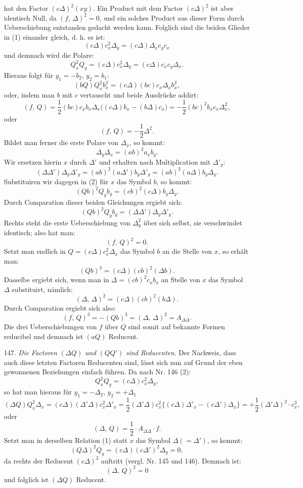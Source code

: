 \documentclass[11pt]{article}
\providecommand{\weberpage}[1]{}
\providecommand{\weq}[2]{\begin{equation}\tag{#1}#2\end{equation}}
\let\Delta\varDelta
\begin{document}
\weberpage{170}
hat den Factor $(c\Delta)^2(xy)$. Ein Product mit dem Factor $(c\Delta)^2$ ist aber identisch Null, da $(f,\,\Delta)^2 = 0$, und ein solches Product aus dieser Form durch Ueberschiebung entstanden gedacht werden kann. Folglich sind die beiden Glieder in (1) einander gleich, d. h. es ist:
\[
(c\Delta)c_x^2 \Delta_y = (c\Delta)\Delta_x c_y c_x
\]
und demnach wird die Polare:
\weq{2}{Q_x^2 Q_y = (c\Delta)c_x^2 \Delta_y = (c\Delta)c_x c_y \Delta_x.}
Hieraus folgt für $y_1 = -b_2$, $y_2 = b_1$:
\[
(bQ)Q_x^2 b_x^2 = (c\Delta)(bc)c_x \Delta_x b_x^2,
\]
oder, indem man $b$ mit $c$ vertauscht und beide Ausdrücke addirt:
\[
(f,\,Q) = \frac{1}{2}(bc)c_x b_x \Delta_x \big((c\Delta)b_x - (b\Delta)c_x\big)
= -\frac{1}{2}(bc)^2 b_x c_x \Delta_x^2,
\]
oder
\weq{I}{(f,\,Q) = -\frac{1}{2}\Delta^2.}
Bildet man ferner die erste Polare von $\Delta_x$, so kommt:
\weq{3}{\Delta_y \Delta_x = (ab)^2 a_x b_y.}
Wir ersetzen hierin $x$ durch $\Delta'$ und erhalten nach Multiplication mit $\Delta'_y$:
\[
(\Delta\Delta')\Delta_y \Delta'_y = (ab)^2(a\Delta')b_y \Delta'_y = (ab)^2(a\Delta)b_y \Delta_y.
\]
Substituiren wir dagegen in (2) für $x$ das Symbol $b$, so kommt:
\[
(Qb)^2 Q_y b_y = (cb)^2(c\Delta)b_y \Delta_y.
\]
Durch Comparation dieser beiden Gleichungen ergiebt sich:
\[
(Qb)^2 Q_y b_y = (\Delta\Delta')\Delta_y \Delta'_y.
\]
Rechts steht die erste Ueberschiebung von $\Delta_y^2$ über sich selbst, sie verschwindet identisch; also hat man:
\weq{II}{(f,\,Q)^2 = 0.}
Setzt man endlich in $Q = (c\Delta)c_x^2 \Delta_x$ das Symbol $b$ an die Stelle von $x$, so erhält man:
\[
(Qb)^3 = (c\Delta)(cb)^2(\Delta b).
\]
Dasselbe ergiebt sich, wenn man in $\Delta = (cb)^2 c_x b_x$ an Stelle von $x$ das Symbol $\Delta$ substituirt, nämlich:
\[
(\Delta,\,\Delta)^2 = (c\Delta)(cb)^2(b\Delta).
\]
Durch Comparation ergiebt sich also:
\weq{III}{(f,\,Q)^3 = -(Qb)^3 = (\Delta,\,\Delta)^2 = A_{\Delta\Delta}.}
Die drei Ueberschiebungen von $f$ über $Q$ sind somit auf bekannte Formen reducibel und demnach ist $(aQ)$ Reducent.


\weberpage{171}
147. \textit{Die Factoren $(\Delta Q)$ und $(QQ')$ sind Reducenten.} Der Nachweis, dass auch diese letzten Factoren Reducenten sind, lässt sich nun auf Grund der eben gewonnenen Beziehungen einfach führen. Da nach Nr. 146 (2):
\weq{1}{Q_x^2 Q_y = (c\Delta)c_x^2 \Delta_y,}
so hat man hieraus für $y_1 = -\Delta_2$, $y_2 = +\Delta_1$
\[
(\Delta Q)Q_x^2 \Delta_x = (c\Delta)(\Delta'\Delta)c_x^2 \Delta'_x
= \frac{1}{2}(\Delta'\Delta)c_x^2 \{(c\Delta)\Delta'_x - (c\Delta')\Delta_x\}
= +\frac{1}{2}(\Delta'\Delta)^2 \cdot c_x^3,
\]
oder
\weq{IV}{(\Delta,\,Q) = \frac{1}{2}\cdot A_{\Delta\Delta}\cdot f.}
Setzt man in derselben Relation (1) statt $x$ das Symbol $\Delta (= \Delta')$, so kommt:
\[
(Q\Delta)^2 Q_y = (c\Delta)(c\Delta')^2 \Delta_y = 0,
\]
da rechts der Reducent $(c\Delta)^2$ auftritt (vergl. Nr. 145 und 146). Demnach ist:
\weq{V}{(\Delta,\,Q)^2 = 0}
und folglich ist $(\Delta Q)$ Reducent.
\end{document}
